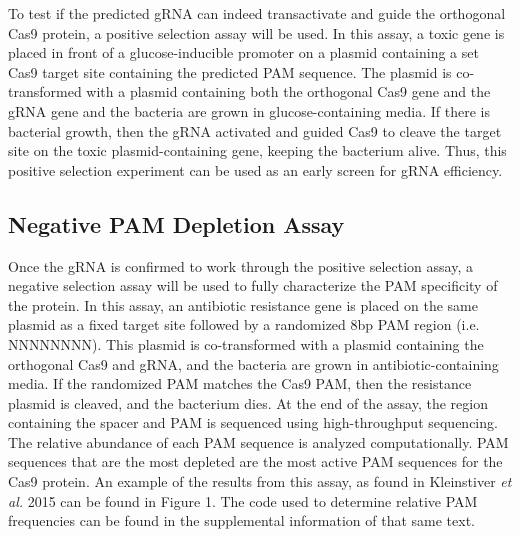 To test if the predicted gRNA can indeed transactivate and guide the orthogonal Cas9 protein, a positive selection assay will be used. In this assay, a toxic gene is placed in front of a glucose-inducible promoter on a plasmid containing a set Cas9 target site containing the predicted PAM sequence. The plasmid is co-transformed with a plasmid containing both the orthogonal Cas9 gene and the gRNA gene and the bacteria are grown in glucose-containing media. If there is bacterial growth, then the gRNA activated and guided Cas9 to cleave the target site on the toxic plasmid-containing gene, keeping the bacterium alive. Thus, this positive selection experiment can be used as an early screen for gRNA efficiency.

\subsection{Negative PAM Depletion Assay}

Once the gRNA is confirmed to work through the positive selection assay, a negative selection assay will be used to fully characterize the PAM specificity of the protein. In this assay, an antibiotic resistance gene is placed on the same plasmid as a fixed target site followed by a randomized 8bp PAM region (i.e. NNNNNNNN). This plasmid is co-transformed with a plasmid containing the orthogonal Cas9 and gRNA, and the bacteria are grown in antibiotic-containing media. If the randomized PAM matches the Cas9 PAM, then the resistance plasmid is cleaved, and the bacterium dies. At the end of the assay, the region containing the spacer and PAM is sequenced using high-throughput sequencing. The relative abundance of each PAM sequence is analyzed computationally. PAM sequences that are the most depleted are the most active PAM sequences for the Cas9 protein. An example of the results from this assay, as found in Kleinstiver \textit{et al.} 2015 can be found in Figure 1. The code used to determine relative PAM frequencies can be found in the supplemental information of that same text.


